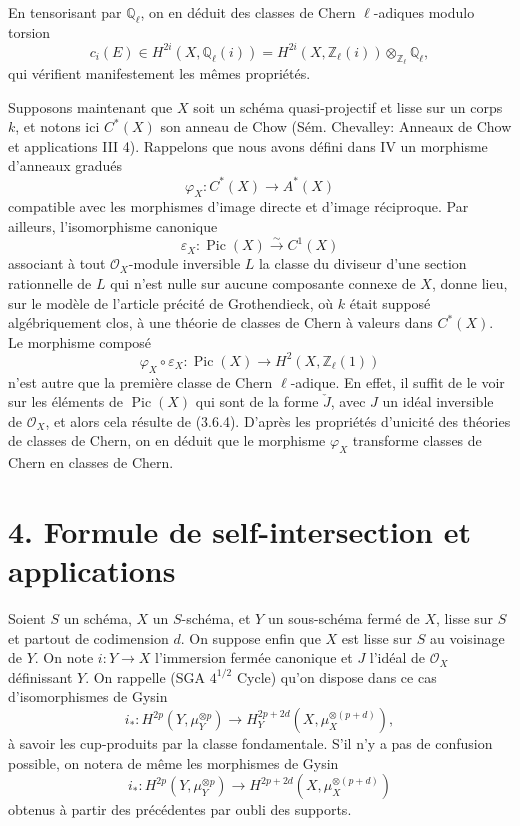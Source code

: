 \documentclass[11pt]{article}
\providecommand{\Pic}{\operatorname{Pic}}
\begin{document}
En tensorisant par $\mathbb Q_\ell$, on en déduit des classes de Chern $\ell$-adiques modulo torsion
\[
c_i(E)\in H^{2i}(X,\mathbb Q_\ell(i))
=H^{2i}(X,\mathbb Z_\ell(i))\otimes_{\mathbb Z_\ell}\mathbb Q_\ell,
\]
qui vérifient manifestement les mêmes propriétés.

Supposons maintenant que $X$ soit un schéma quasi-projectif et lisse sur un corps $k$, et notons ici $C^*(X)$ son anneau de Chow (Sém. Chevalley: Anneaux de Chow et applications III 4). Rappelons que nous avons défini dans IV un morphisme d'anneaux gradués
\[
\varphi_X:C^*(X)\to A^*(X)
\]
compatible avec les morphismes d'image directe et d'image réciproque. Par ailleurs, l'isomorphisme canonique
\[
\varepsilon_X:\Pic(X)\xrightarrow{\sim} C^1(X)
\]
associant à tout $\mathcal O_X$-module inversible $L$ la classe du diviseur d'une section rationnelle de $L$ qui n'est nulle sur aucune composante connexe de $X$, donne lieu, sur le modèle de l'article précité de Grothendieck, où $k$ était supposé algébriquement clos, à une théorie de classes de Chern à valeurs dans $C^*(X)$. Le morphisme composé
\[
\varphi_X\circ\varepsilon_X:\Pic(X)\longrightarrow H^2(X,\mathbb Z_\ell(1))
\]
n'est autre que la première classe de Chern $\ell$-adique. En effet, il suffit de le voir sur les éléments de $\Pic(X)$ qui sont de la forme $\check J$, avec $J$ un idéal inversible de $\mathcal O_X$, et alors cela résulte de (3.6.4). D'après les propriétés d'unicité des théories de classes de Chern, on en déduit que le morphisme $\varphi_X$ transforme classes de Chern en classes de Chern.

\section*{4. Formule de self-intersection et applications}

Soient $S$ un schéma, $X$ un $S$-schéma, et $Y$ un sous-schéma fermé de $X$, lisse sur $S$ et partout de codimension $d$. On suppose enfin que $X$ est lisse sur $S$ au voisinage de $Y$. On note $i:Y\to X$ l'immersion fermée canonique et $J$ l'idéal de $\mathcal O_X$ définissant $Y$. On rappelle (SGA $4^{1/2}$ Cycle) qu'on dispose dans ce cas d'isomorphismes de Gysin
\[
i_*:H^{2p}(Y,\mu_Y^{\otimes p})
\to H_Y^{2p+2d}(X,\mu_X^{\otimes(p+d)}),
\]
à savoir les cup-produits par la classe fondamentale. S'il n'y a pas de confusion possible, on notera de même les morphismes de Gysin
\[
i_*:H^{2p}(Y,\mu_Y^{\otimes p})
\to H^{2p+2d}(X,\mu_X^{\otimes(p+d)})
\]
obtenus à partir des précédentes par oubli des supports.
\end{document}
